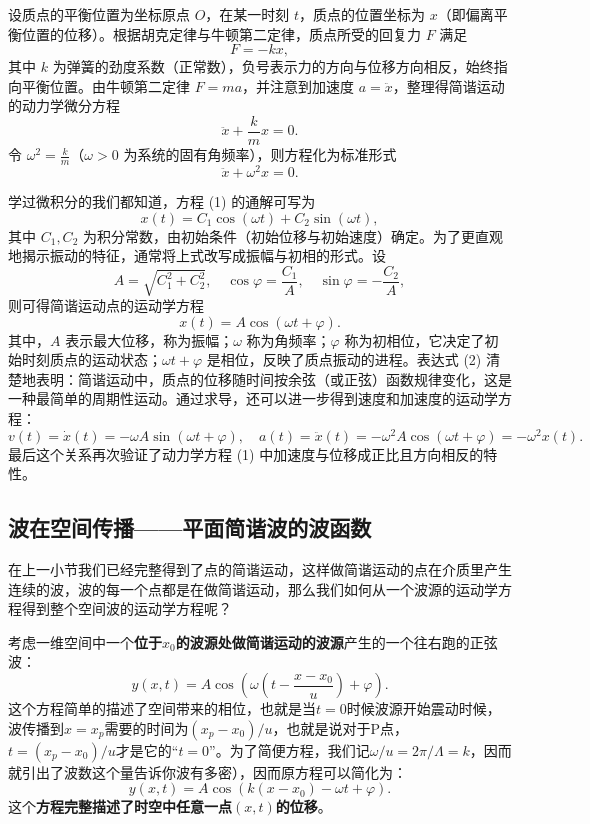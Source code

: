 \documentclass[UTF8]{ctexbook}
\begin{document}
设质点的平衡位置为坐标原点 \(O\)，在某一时刻 \(t\)，质点的位置坐标为 \(x\)（即偏离平衡位置的位移）。根据胡克定律与牛顿第二定律，质点所受的回复力 \(F\) 满足
\[
F = -kx,
\]
其中 \(k\) 为弹簧的劲度系数（正常数），负号表示力的方向与位移方向相反，始终指向平衡位置。由牛顿第二定律 \(F = ma\)，并注意到加速度 \(a = \ddot{x}\)，整理得简谐运动的动力学微分方程
\[
\ddot{x} + \frac{k}{m} x = 0.
\]
令 \(\omega^2 = \frac{k}{m}\)（\(\omega>0\) 为系统的固有角频率），则方程化为标准形式
\[
\ddot{x} + \omega^2 x = 0. \tag{1}
\]

学过微积分的我们都知道，方程 (1) 的通解可写为
\[
x(t) = C_1 \cos(\omega t) + C_2 \sin(\omega t),
\]
其中 \(C_1, C_2\) 为积分常数，由初始条件（初始位移与初始速度）确定。为了更直观地揭示振动的特征，通常将上式改写成振幅与初相的形式。设
\[
A = \sqrt{C_1^2 + C_2^2}, \quad \cos\varphi = \frac{C_1}{A}, \quad \sin\varphi = -\frac{C_2}{A},
\]
则可得简谐运动点的运动学方程
\[
\boxed{x(t) = A \cos(\omega t + \varphi)}. \tag{2}
\]
其中，\(A\) 表示最大位移，称为振幅；\(\omega\) 称为角频率；\(\varphi\) 称为初相位，它决定了初始时刻质点的运动状态；\(\omega t + \varphi\) 是相位，反映了质点振动的进程。表达式 (2) 清楚地表明：简谐运动中，质点的位移随时间按余弦（或正弦）函数规律变化，这是一种最简单的周期性运动。通过求导，还可以进一步得到速度和加速度的运动学方程：
\[
v(t) = \dot{x}(t) = -\omega A \sin(\omega t + \varphi), \quad a(t) = \ddot{x}(t) = -\omega^2 A \cos(\omega t + \varphi) = -\omega^2 x(t).
\]
最后这个关系再次验证了动力学方程 (1) 中加速度与位移成正比且方向相反的特性。

\subsection{波在空间传播——平面简谐波的波函数}

在上一小节我们已经完整得到了点的简谐运动，这样做简谐运动的点在介质里产生连续的波，波的每一个点都是在做简谐运动，那么我们如何从一个波源的运动学方程得到整个空间波的运动学方程呢？

考虑一维空间中一个\textbf{位于$x_0$的波源处做简谐运动的波源}产生的一个往右跑的正弦波：
\[
y(x,t) = A\cos(\omega (t-\frac{x-x_0}{u}) + \varphi).
\]
这个方程简单的描述了空间带来的相位，也就是当$t=0$时候波源开始震动时候，波传播到$x=x_p$需要的时间为$(x_p-x_0)/u$，也就是说对于P点，$t=(x_p-x_0)/u$才是它的“$t=0$”。为了简便方程，我们记$\omega/u=2\pi/\Lambda=k$，因而就引出了波数这个量告诉你波有多密），因而原方程可以简化为：
\[
y(x,t) = A\cos(k(x-x_0) - \omega t + \varphi).
\]
这个\textbf{方程完整描述了时空中任意一点$(x,t)$的位移}。
\end{document}
